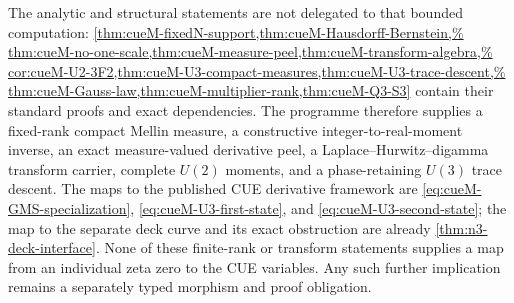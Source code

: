 The analytic and structural statements are not delegated to that bounded computation:
\cref{thm:cueM-fixedN-support,thm:cueM-Hausdorff-Bernstein,%
thm:cueM-no-one-scale,thm:cueM-measure-peel,thm:cueM-transform-algebra,%
cor:cueM-U2-3F2,thm:cueM-U3-compact-measures,thm:cueM-U3-trace-descent,%
thm:cueM-Gauss-law,thm:cueM-multiplier-rank,thm:cueM-Q3-S3}
contain their standard proofs and exact dependencies.  The programme therefore supplies a
fixed-rank compact Mellin measure, a constructive integer-to-real-moment inverse, an exact
measure-valued derivative peel, a Laplace--Hurwitz--digamma transform carrier, complete
$U(2)$ moments, and a phase-retaining $U(3)$ trace descent.  The maps to the published CUE
derivative framework are \eqref{eq:cueM-GMS-specialization},
\eqref{eq:cueM-U3-first-state}, and \eqref{eq:cueM-U3-second-state}; the map to the separate
deck curve and its exact obstruction are already
\cref{thm:n3-deck-interface}.  None of these finite-rank or transform statements supplies a
map from an individual zeta zero to the CUE variables.  Any such further implication remains
a separately typed morphism and proof obligation.
